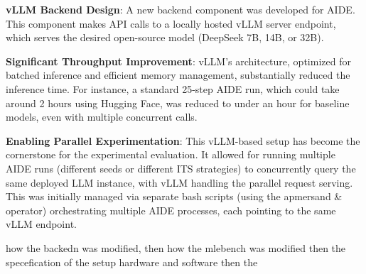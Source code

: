 \textbf{vLLM Backend Design}: A new backend component was developed for AIDE. This component makes API calls to a locally hosted vLLM server endpoint, which serves the desired open-source model (DeepSeek 7B, 14B, or 32B).

\textbf{Significant Throughput Improvement}: vLLM's architecture, optimized for batched inference and efficient memory management, substantially reduced the inference time. For instance, a standard 25-step AIDE run, which could take around 2 hours using Hugging Face, was reduced to under an hour for baseline models, even with multiple concurrent calls.

\textbf{Enabling Parallel Experimentation}: This vLLM-based setup has become the cornerstone for the experimental evaluation. It allowed for running multiple AIDE runs (different seeds or different ITS strategies) to concurrently query the same deployed LLM instance, with vLLM handling the parallel request serving. This was initially managed via separate bash scripts (using the apmersand \& operator) orchestrating multiple AIDE processes, each pointing to the same vLLM endpoint.

how the backedn was modified, 
then how the mlebench was modified
then the specefication of the setup hardware and software
then the 



